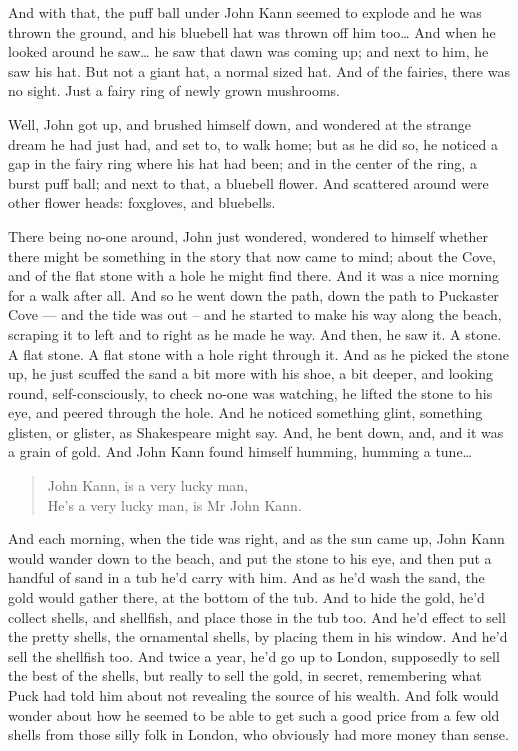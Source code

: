 \documentclass[
  12pt,
  a5paper,
  twoside]{book}
\begin{document}
And with that, the puff ball under John Kann seemed to explode and he
was thrown the ground, and his bluebell hat was thrown off him
too\ldots{} And when he looked around he saw\ldots{} he saw that dawn
was coming up; and next to him, he saw his hat. But not a giant hat, a
normal sized hat. And of the fairies, there was no sight. Just a fairy
ring of newly grown mushrooms.

Well, John got up, and brushed himself down, and wondered at the strange
dream he had just had, and set to, to walk home; but as he did so, he
noticed a gap in the fairy ring where his hat had been; and in the
center of the ring, a burst puff ball; and next to that, a bluebell
flower. And scattered around were other flower heads: foxgloves, and
bluebells.

There being no-one around, John just wondered, wondered to himself
whether there might be something in the story that now came to mind;
about the Cove, and of the flat stone with a hole he might find there.
And it was a nice morning for a walk after all. And so he went down the
path, down the path to Puckaster Cove --- and the tide was out -- and he
started to make his way along the beach, scraping it to left and to
right as he made he way. And then, he saw it. A stone. A flat stone. A
flat stone with a hole right through it. And as he picked the stone up,
he just scuffed the sand a bit more with his shoe, a bit deeper, and
looking round, self-consciously, to check no-one was watching, he lifted
the stone to his eye, and peered through the hole. And he noticed
something glint, something glisten, or glister, as Shakespeare might
say. And, he bent down, and, and it was a grain of gold. And John Kann
found himself humming, humming a tune\ldots{}

\begin{quote}
John Kann, is a very lucky man,\\
He's a very lucky man, is Mr John Kann.
\end{quote}

And each morning, when the tide was right, and as the sun came up, John
Kann would wander down to the beach, and put the stone to his eye, and
then put a handful of sand in a tub he'd carry with him. And as he'd
wash the sand, the gold would gather there, at the bottom of the tub.
And to hide the gold, he'd collect shells, and shellfish, and place
those in the tub too. And he'd effect to sell the pretty shells, the
ornamental shells, by placing them in his window. And he'd sell the
shellfish too. And twice a year, he'd go up to London, supposedly to
sell the best of the shells, but really to sell the gold, in secret,
remembering what Puck had told him about not revealing the source of his
wealth. And folk would wonder about how he seemed to be able to get such
a good price from a few old shells from those silly folk in London, who
obviously had more money than sense.
\end{document}
